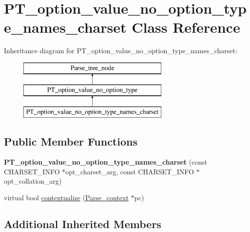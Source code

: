 \hypertarget{classPT__option__value__no__option__type__names__charset}{}\section{P\+T\+\_\+option\+\_\+value\+\_\+no\+\_\+option\+\_\+type\+\_\+names\+\_\+charset Class Reference}
\label{classPT__option__value__no__option__type__names__charset}
Inheritance diagram for P\+T\+\_\+option\+\_\+value\+\_\+no\+\_\+option\+\_\+type\+\_\+names\+\_\+charset\+:\begin{figure}[H]
\begin{center}
\leavevmode
\includegraphics[height=3.000000cm]{classPT__option__value__no__option__type__names__charset}
\end{center}
\end{figure}
\subsection*{Public Member Functions}
\begin{DoxyCompactItemize}
\item 
\mbox{\label{classPT__option__value__no__option__type__names__charset_a11410c57657fd4ea395854cf8ee3bf72}} 
{\bfseries P\+T\+\_\+option\+\_\+value\+\_\+no\+\_\+option\+\_\+type\+\_\+names\+\_\+charset} (const C\+H\+A\+R\+S\+E\+T\+\_\+\+I\+N\+FO $\ast$opt\+\_\+charset\+\_\+arg, const C\+H\+A\+R\+S\+E\+T\+\_\+\+I\+N\+FO $\ast$opt\+\_\+collation\+\_\+arg)
\item 
virtual bool \mbox{\hyperlink{classPT__option__value__no__option__type__names__charset_aa54fc142e0ce2603ed24149c673a1ee9}{contextualize}} (\mbox{\hyperlink{structParse__context}{Parse\+\_\+context}} $\ast$pc)
\end{DoxyCompactItemize}
\subsection*{Additional Inherited Members}


